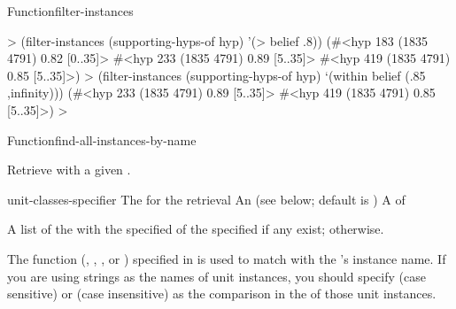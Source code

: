 \documentclass[10pt,twoside,english,pdftex]{article}
\begin{document}
\begin{functiondoc}{Function}{filter-instances}
\fnexamples
%
\W\supp
\begin{example}
  > (filter-instances (supporting-hyps-of hyp) '(> belief .8))
  (#<hyp 183 (1835 4791) 0.82 [0..35]>
   #<hyp 233 (1835 4791) 0.89 [5..35]>
   #<hyp 419 (1835 4791) 0.85 [5..35]>)\goodpagebreak
  > (filter-instances (supporting-hyps-of hyp) `(within belief (.85 ,infinity)))
  (#<hyp 233 (1835 4791) 0.89 [5..35]>
   #<hyp 419 (1835 4791) 0.85 [5..35]>)
  >
\end{example}

\fnnote
\patternnote

\end{functiondoc}


\begin{functiondoc}{Function}{find-all-instances-by-name}%
  {
      
    \returns{} } 
%
%
%

\fnsyntax

\fnpurpose Retrieve  with a given .

\fnpackage {}

\fnmodule {}

\fnargs
\begin{args}{unit-classes-specifier}
 The  for the retrieval
 An 
(see below; default is )
 A  of 
\end{args}

\fnreturns A list of the  with the specified
 of the specified  if any exist; \nil{} otherwise.

\fndsyntax
\W\supp\tabletop
\unitclassspec
\subclassingspec

\fndescription The  function
(, , , or )
specified in  is used to match
 with the 's instance name.
If you are using strings as the names of unit instances, you should specify
 (case sensitive) or  (case
insensitive) as the comparison  in the  of
those unit instances.


\end{functiondoc}
\end{document}
